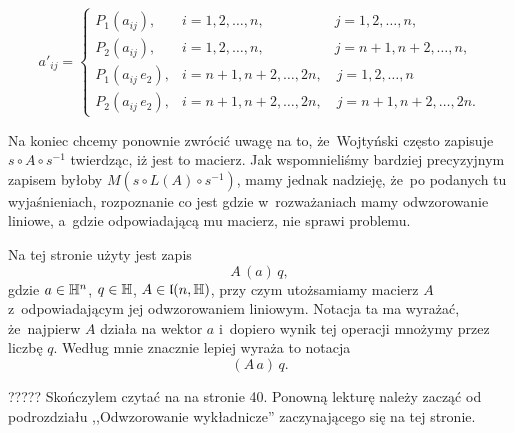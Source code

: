 \documentclass[a4paper,11pt]{article}
\numberwithin{equation}{section}
\begin{document}
\begin{equation}
  \label{eq:Wojtynski-97}
  a'_{ i j } =
  \begin{cases}
    P_{ 1 }( a_{ i j } ), &i = 1, 2, \ldots, n, \qquad \qquad \quad
                            j = 1, 2, \ldots, n, \\
    P_{ 2 }( a_{ i j } ), &i = 1, 2, \ldots, n, \qquad \qquad \quad
                            j = n + 1, n + 2, \ldots, n, \\
    P_{ 1 }( a_{ i j } \, e_{ 2 } ), &i = n + 1, n + 2, \ldots, 2n, \quad
                                       j = 1, 2, \ldots, n \\
    P_{ 2 }( a_{ i j } \, e_{ 2 } ), &i = n + 1, n + 2, \ldots, 2n, \quad
                                       j = n + 1, n + 2, \ldots, 2n.
  \end{cases}
\end{equation}

Na koniec chcemy ponownie zwrócić uwagę na to, że~Wojtyński często zapisuje
$s \circ A \circ s^{ -1 }$ twierdząc, iż jest to macierz. Jak wspomnieliśmy bardziej
precyzyjnym zapisem byłoby $M\!( s \circ L( A ) \circ s^{ -1 } )$, mamy jednak
nadzieję, że~po podanych tu wyjaśnieniach, rozpoznanie co jest gdzie
w~rozważaniach mamy odwzorowanie liniowe, a~gdzie odpowiadającą mu macierz,
nie sprawi problemu.

\VerSpaceFour





\noindent
{} Na tej stronie użyty jest zapis
\begin{equation}
  \label{eq:Wojtynski-98}
  A \, ( a ) \, q,
\end{equation}
gdzie $a \in \mathbb{H}^{ n }$, $q \in \mathbb{H}$, $A \in \mathfrak{l}( n, \mathbb{H} )$, przy czym
utożsamiamy macierz $A$ z~odpowiadającym jej odwzorowaniem liniowym.
Notacja ta ma wyrażać, że~najpierw $A$ działa na wektor $a$ i~dopiero wynik
tej operacji mnożymy przez liczbę $q$. Według mnie znacznie lepiej wyraża
to notacja
\begin{equation}
  \label{eq:Wojtynski-99}
  ( A \, a ) \, q.
\end{equation}





????? Skończylem czytać na na stronie 40. Ponowną lekturę należy zacząć od podrozdziału ,,Odwzorowanie wykładnicze''
zaczynającego się na tej stronie.
\end{document}
